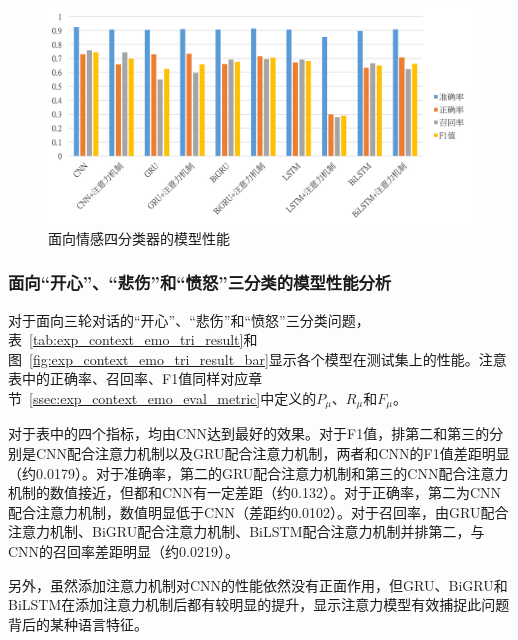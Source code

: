 \begin{figure}[H]
  \centering
  \includegraphics[width=\textwidth]{img/exp_context_emo_0_result_bar.png}
  \caption{面向情感四分类器的模型性能}
  \label{fig:exp_context_emo_0_result_bar}
\end{figure}

\subsubsection{面向“开心”、“悲伤”和“愤怒”三分类的模型性能分析}
\label{sssec:exp_context_emo_tri_base}

对于面向三轮对话的“开心”、“悲伤”和“愤怒”三分类问题，表~\ref{tab:exp_context_emo_tri_result}和图~\ref{fig:exp_context_emo_tri_result_bar}显示各个模型在测试集上的性能。注意表中的正确率、召回率、F1值同样对应章节~\ref{ssec:exp_context_emo_eval_metric}中定义的$P_\mu$、$R_\mu$和$F_\mu$。

对于表中的四个指标，均由CNN达到最好的效果。对于F1值，排第二和第三的分别是CNN配合注意力机制以及GRU配合注意力机制，两者和CNN的F1值差距明显（约0.0179）。对于准确率，第二的GRU配合注意力机制和第三的CNN配合注意力机制的数值接近，但都和CNN有一定差距（约0.132）。对于正确率，第二为CNN配合注意力机制，数值明显低于CNN（差距约0.0102）。对于召回率，由GRU配合注意力机制、BiGRU配合注意力机制、BiLSTM配合注意力机制并排第二，与CNN的召回率差距明显（约0.0219）。

另外，虽然添加注意力机制对CNN的性能依然没有正面作用，但GRU、BiGRU和BiLSTM在添加注意力机制后都有较明显的提升，显示注意力模型有效捕捉此问题背后的某种语言特征。

